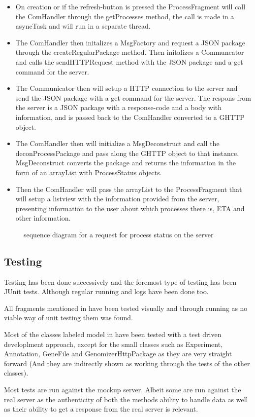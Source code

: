     \begin{itemize}
    	
        \item
        	On creation or if the refresh-button is pressed the ProcessFragment will call the ComHandler through the getProcesses method, the call is made in a asyncTask and will run in a separate thread.
       	\item
        	The ComHandler then initalizes a MsgFactory and request a JSON package through the createRegularPackage method. Then initalizes a Communcator and calls the sendHTTPRequest method with the JSON package and a get command for the server.
      	\item
        	The Communicator then will setup a HTTP connection to the server and send the JSON package with a get command for the server. The respons from the server is a JSON package with a response-code and a body with information, and is passed back to the ComHandler converted to a GHTTP object.
       	\item
        	The ComHandler then will initialize a MsgDeconstruct and call the deconProcessPackage and pass along the GHTTP object to that instance. MsgDeconstruct converts the package and returns the information in the form of an arrayList with ProcessStatus objects.
      	\item
        	Then the ComHandler will pass the arrayList to the ProcessFragment that will setup a listview with the information provided from the server, presenting information to the user about which processes there is, ETA and other information.
            
    \end{itemize}
    
    \begin{figure}
        \caption{sequence diagram for a request for process status on the server}
        \label{fig:and_processseq}
    \end{figure}
\FloatBarrier


\subsection{Testing}
Testing has been done successively and the foremost type of testing has been JUnit tests. Although regular running and logs have been done too.

All fragments mentioned in  have been tested visually and through running as no viable way of unit testing them was found.

Most of the classes labeled model in  have been tested with a test driven developlment approach, except for the small classes such as Experiment, Annotation, GeneFile and GenomizerHttpPackage as they are very straight forward (And they are indirectly shown as working through the tests of the other classes).

Most tests are run against the mockup server. Albeit some are run against the real server as the authenticity of both the methods ability to handle data as well as their ability to get a response from the real server is relevant. 
